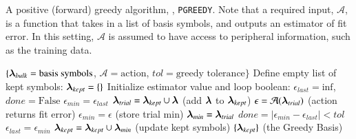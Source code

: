 \documentclass[twocolumn,aps,prd,floatfix,preprintnumbers,a4paper,nofootinbib,
superscriptaddress,10pt]{revtex4-1}
\begin{document}
{\scriptsize
\begin{algorithm}[H]
  \caption{A positive (forward) greedy algorithm, \pgreedy{}, \texttt{PGREEDY}. Note that a required input, $\mathcal{A}$, is a function that takes in a list of basis symbols, and outputs an estimator of fit error. In this setting, $\mathcal{A}$ is assumed to have access to peripheral information, such as the training data.}
  \label{alg:pgreedy}
  \begin{algorithmic}[1]
     $ \{ {\bm{\lambda}}_{bulk} = \text{basis symbols}$, $\mathcal{A} = \text{action}$, $tol=\text{greedy tolerance}\}$
    \vskip 10pt
    \State Define empty list of kept symbols: ${\bm{\lambda}}_{kept} = \{\}$
    \State Initialize estimator value and loop boolean: $\epsilon_{last} = \mathrm{inf}$, $done = \text{False}$
      \State $\epsilon_{min} = \epsilon_{last}$
        \State ${\bm{\lambda}}_{trial} = {\bm{\lambda}}_{kept} \cup {\bm{\lambda}}$ {\hskip0.525in} (add ${\bm{\lambda}}$ to ${\bm{\lambda}}_{kept}$)
        \State $\epsilon = \mathcal{A}({\bm{\lambda}}_{trial})$ {\hskip0.70in} (action returns fit error)
          \State $\epsilon_{min} = \epsilon$  {\hskip0.825in} (store trial min)
          \State ${\bm{\lambda}}_{min} = {\bm{\lambda}}_{trial}$
        \EndIf
      \EndFor
      \State $done = |\epsilon_{min}-\epsilon_{last}|<tol$ %
        \State $\epsilon_{last} = \epsilon_{min}$
        \State ${\bm{\lambda}}_{kept} = {\bm{\lambda}}_{kept} \cup {\bm{\lambda}}_{min}$ {\hskip0.4in} (update kept symbols)
      \EndIf
    \EndWhile
    \vskip 10pt
     $\{ {\bm{\lambda}}_{kept} \}$ (the Greedy Basis)
  \end{algorithmic}
\end{algorithm}
}

%
\end{document}
